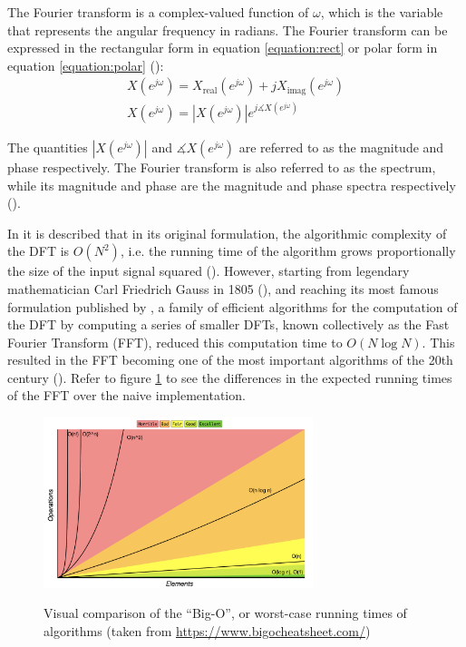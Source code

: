 \documentclass[report.tex]{subfiles}
\begin{document}
The Fourier transform is a complex-valued function of $\omega$, which is the variable that represents the angular frequency in radians. The Fourier transform can be expressed in the rectangular form in equation \ref{equation:rect} or polar form in equation \ref{equation:polar} (\cite[Chapter~2]{discretebook}):
\begin{align}
	X(e^{j\omega}) = X_{\text{real}}(e^{j\omega}) + j X_{\text{imag}}(e^{j\omega}) \tag{5}\label{equation:rect} \\
	X(e^{j\omega}) = |X(e^{j\omega})|e^{j\measuredangle X(e^{j\omega})} \tag{6}\label{equation:polar}
\end{align}

The quantities $|X(e^{j\omega})|$ and $\measuredangle X(e^{j\omega})$ are referred to as the magnitude and phase respectively. The Fourier transform is also referred to as the spectrum, while its magnitude and phase are the magnitude and phase spectra respectively (\cite{discretebook}).

In \textcite[Chapter~9]{discretebook} it is described that in its original formulation, the algorithmic complexity of the DFT is $O(N^{2})$, i.e. the running time of the algorithm grows proportionally the size of the input signal squared (\cite{skiena}). However, starting from legendary mathematician Carl Friedrich Gauss in 1805 (\cite{gausshist}), and reaching its most famous formulation published by \textcite{cooleytukey}, a family of efficient algorithms for the computation of the DFT by computing a series of smaller DFTs, known collectively as the Fast Fourier Transform (FFT), reduced this computation time to $O(N \log{N})$. This resulted in the FFT becoming one of the most important algorithms of the 20th century (\cite{ffttopten}). Refer to figure \ref{fig:bigo} to see the differences in the expected running times of the FFT over the naive implementation.

\begin{figure}[ht]
	\centering
	\includegraphics[width=0.7\textwidth]{./images-misc/bigo.png}\\
	\caption{Visual comparison of the ``Big-O'', or worst-case running times of algorithms (taken from \url{https://www.bigocheatsheet.com/})}
	\label{fig:bigo}
\end{figure}
\end{document}
